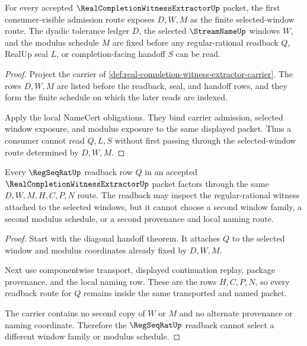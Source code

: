 \begin{theorem}
\label{thm:real-completion-witness-extractor-selected-window-admission}
For every accepted $\RealCompletionWitnessExtractorUp$ packet, the first
consumer-visible admission route exposes $D,W,M$ as the finite selected-window
route. The dyadic tolerance ledger $D$, the selected $\StreamNameUp$ windows
$W$, and the modulus schedule $M$ are fixed before any regular-rational
readback $Q$, RealUp seal $L$, or completion-facing handoff $S$ can be read.
\end{theorem}
\begin{proof}
Project the carrier of \autoref{def:real-completion-witness-extractor-carrier}.
The rows $D,W,M$ are listed before the readback, seal, and handoff rows, and
they form the finite schedule on which the later reads are indexed.

Apply the local NameCert obligations. They bind carrier admission, selected
window exposure, and modulus exposure to the same displayed packet. Thus a
consumer cannot read $Q,L,S$ without first passing through the selected-window
route determined by $D,W,M$.
\end{proof}

\begin{theorem}
\label{thm:real-completion-witness-extractor-regular-readback-route}
Every $\RegSeqRatUp$ readback row $Q$ in an accepted
$\RealCompletionWitnessExtractorUp$ packet factors through the same
$D,W,M,H,C,P,N$ route. The readback may inspect the regular-rational witness
attached to the selected windows, but it cannot choose a second window family,
a second modulus schedule, or a second provenance and local naming route.
\end{theorem}
\begin{proof}
Start with the diagonal handoff theorem. It attaches $Q$ to the selected
window and modulus coordinates already fixed by $D,W,M$.

Next use componentwise transport, displayed continuation replay, package
provenance, and the local naming row. These are the rows $H,C,P,N$, so every
readback route for $Q$ remains inside the same transported and named packet.

The carrier contains no second copy of $W$ or $M$ and no alternate provenance
or naming coordinate. Therefore the $\RegSeqRatUp$ readback cannot select a
different window family or modulus schedule.
\end{proof}

